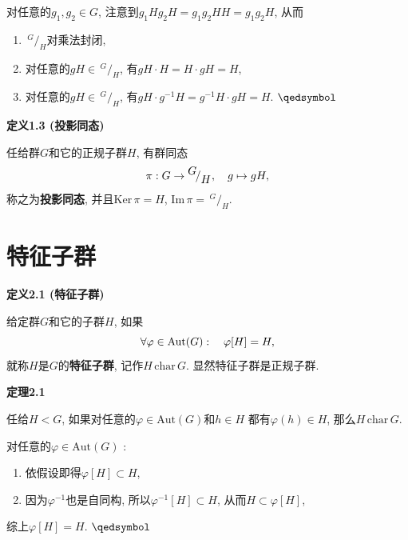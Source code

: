 \documentclass[UTF8]{ctexart}
\begin{document}

对任意的$g_1,g_2\in G$, 注意到$g_1Hg_2H=g_1g_2HH=g_1g_2H$, 从而
\vspace{3pt}
\begin{enumerate}
    \item $\,\!^{\displaystyle G}\!/_{\displaystyle H}$对乘法封闭,
    \vspace{3pt}
    \item 对任意的$gH\in\,\!^{\displaystyle G}\!/_{\displaystyle H}$,
    有$gH\cdot H=H\cdot gH=H$,
    \vspace{3pt}
    \item 对任意的$gH\in\,\!^{\displaystyle G}\!/_{\displaystyle H}$,
    有$gH\cdot g^{-1}H=g^{-1}H\cdot gH=H$. \hfill $\qedsymbol$
\end{enumerate}

\vspace{10pt}

\hypertarget{sec:定义1.3}{}
\noindent\textbf{定义1.3 (投影同态)}

任给群$G$和它的正规子群$H$, 有群同态
\[
    \pi:G\to\,\!^{\displaystyle G}\!/_{\displaystyle H},\quad g\mapsto gH,\\[3pt]
\]
称之为\textbf{投影同态}, 并且$\mathrm{Ker}\,\pi=H$,
$\mathrm{Im}\,\pi=\,\!^{\displaystyle G}\!/_{\displaystyle H}$.





\newpage


\section{特征子群}

\hypertarget{sec:定义2.1}{}
\noindent\textbf{定义2.1 (特征子群)}

给定群$G$和它的子群$H$, 如果
\vspace{-3pt}
\[
    \forall\varphi\in\mathrm{Aut}(G):\quad\varphi[H]=H,\\[-3pt]
\]
就称$H$是$G$的\textbf{特征子群}, 记作$H\,\mathrm{char}\,G$.
显然特征子群是正规子群.

\vspace{10pt}

\hypertarget{sec:定理2.1}{}
\noindent\textbf{定理2.1}

任给$H<G$, 如果对任意的$\varphi\in\mathrm{Aut}(G)$和$h\in H$
都有$\varphi(h)\in H$, 那么$H\,\mathrm{char}\,G$.


对任意的$\varphi\in\mathrm{Aut}(G)$ :
\begin{enumerate}
    \item 依假设即得$\varphi[H]\subset H$,
    \item 因为$\varphi^{-1}$也是自同构, 所以$\varphi^{-1}[H]\subset H$,
    从而$H\subset\varphi[H]$,
\end{enumerate}
综上$\varphi[H]=H$. \hfill $\qedsymbol$
\end{document}
